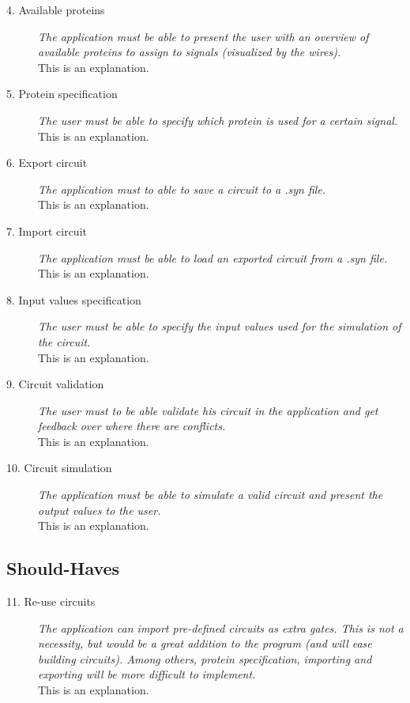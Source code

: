\documentclass[a4paper]{article}
\begin{document}
\begin{description}
\begin{itemize}
	\end{itemize}
\item[4. Available proteins] \textit{The application must be able to present the user with an overview of available proteins to assign to signals (visualized by the wires).}\\
This is an explanation.

\item[5. Protein specification] \textit{The user must be able to specify which protein is used for a certain signal.}\\
This is an explanation.

\item[6. Export circuit] \textit{The application must to able to save a circuit to a .syn file.}\\
This is an explanation.

\item[7. Import circuit] \textit{The application must be able to load an exported circuit from a .syn file.}\\
This is an explanation.

\item[8. Input values specification] \textit{The user must be able to specify the input values used for the simulation of the circuit.}\\
This is an explanation.

\item[9. Circuit validation] \textit{The user must to be able validate his circuit in the application and get feedback over where there are conflicts.}\\
This is an explanation.

\item[10. Circuit simulation] \textit{The application must be able to simulate a valid circuit and present the output values to the user.}\\
This is an explanation.
\end{description}

\subsection{Should-Haves}
\begin{description}
\item[11. Re-use circuits] \textit{The application can import pre-defined circuits as extra gates. This is not a necessity, but would be a great addition to the program (and will ease building circuits). Among others, protein specification, importing and exporting will be more difficult to implement.}\\
This is an explanation.
\end{description}
\end{document}
